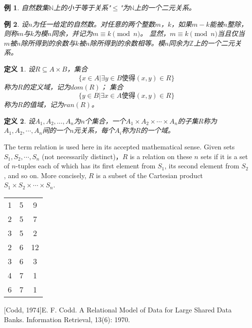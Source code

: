 \documentclass{book}[oneside]
\newtheorem{Def}{定义}[chapter]
\newtheorem{Example}{例}[chapter]
\begin{document}
\begin{CJK*}{UTF8}{gbsn}
  \begin{Example}
    自然数集$\mathbb{N}$上的小于等于关系"$\leq$"为$\mathbb{N}$上的一个二元关系。
  \end{Example}
  \begin{Example}
    设$n$为任一给定的自然数。对任意的两个整数$m$，$k$，如果$m-k$能被$n$整除，则称$m$与$k$为模$n$同余，并记为$m\equiv k \pmod{n}$。
    显然，$m\equiv k \pmod{n}$当且仅当$m$被$n$除所得到的余数与$k$被$n$除所得到的余数相等。模$n$同余为$\mathbb{Z}$上的一个二元关系。
  \end{Example}

    \begin{Def}
    设$R \subseteq A \times B$，集合
    \[\{x \in A | \exists y \in B \text{使得} (x,y) \in R\}\]
    称为$R$的定义域，记为$dom(R)$； 集合
    \[\{y \in B | \exists x \in A \text{使得} (x,y) \in R\}\]
    称为$R$的值域，记为$ran(R)$。
  \end{Def}

    \begin{Def}
    设$A_1, A_2, \ldots, A_n$为$n$个集合，一个$A_1\times A_2 \times \cdots \times A_n$的子集$R$称为$A_1, A_2, \cdots, A_n$间的一个$n$元关系，每个$A_i$称为$R$的一个域。
  \end{Def}

    The term relation is used here in its accepted mathematical sense. Given sets $S_1, S_2, \cdots, S_n$ (not necessarily distinct)，$R$ is a relation on these $n$ sets if it is a set of $n$-tuples each of which has its first element from $S_1$, its second element from $S_2$, and so on. More concisely, $R$ is a subset of the Cartesian product $S_1 \times S_2 \times \cdots \times S_n$.

  \begin{tabular}{ccc}
1& 5& 9\\
    2& 5&7 \\
    3& 5&2 \\
2&6 &12 \\
3&6 &3 \\
    4&7 &1 \\
    6&7 &1 \\
  \end{tabular}

[Codd, 1974]E. F. Codd. A Relational Model of Data for Large Shared Data Banks.
Information Retrieval, 13(6): 1970.



\end{CJK*}
\end{document}
